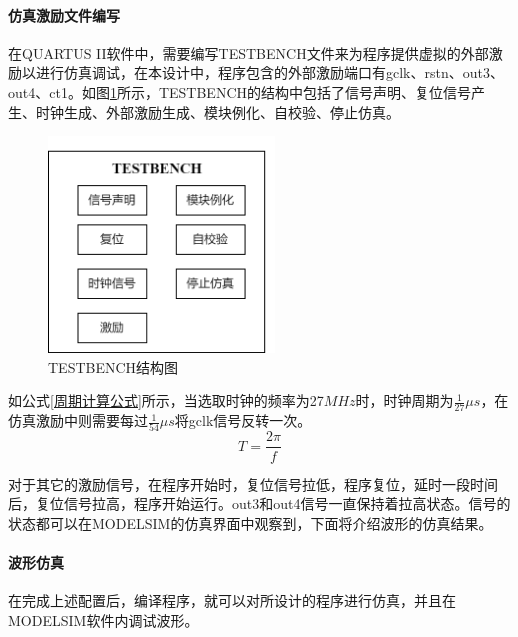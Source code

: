 \paragraph{仿真激励文件编写}
在QUARTUS II软件中，需要编写TESTBENCH文件来为程序提供虚拟的外部激励以进行仿真调试，在本设计中，程序包含的外部激励端口有gclk、rstn、out3、out4、ct1。如图\ref{TESTBENCH结构图}所示，TESTBENCH的结构中包括了信号声明、复位信号产生、时钟生成、外部激励生成、模块例化、自校验、停止仿真。\par
\begin{figure}[ht]
	\centering
	\includegraphics[width=6cm]{figure/TESTBENCH structure.png}
	\caption{TESTBENCH结构图}
	\label{TESTBENCH结构图}
\end{figure}
如公式\ref{周期计算公式}所示，当选取时钟的频率为27$MHz$时，时钟周期为$\frac{1}{27}\mu s$，在仿真激励中则需要每过$\frac{1}{54}
\mu s$将gclk信号反转一次。
\begin{equation}
	T=\frac{2\pi}{f}
	\label{周期计算公式}
\end{equation}\par
对于其它的激励信号，在程序开始时，复位信号拉低，程序复位，延时一段时间后，复位信号拉高，程序开始运行。out3和out4信号一直保持着拉高状态。信号的状态都可以在MODELSIM的仿真界面中观察到，下面将介绍波形的仿真结果。

\newpage
\paragraph{波形仿真}
在完成上述配置后，编译程序，就可以对所设计的程序进行仿真，并且在MODELSIM软件内调试波形。


